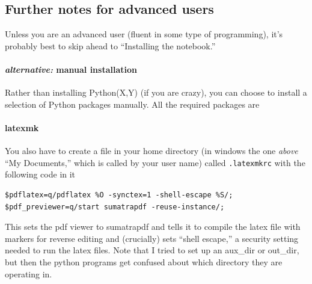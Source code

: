 \subsection{Further notes for advanced users}
Unless you are an advanced user (fluent in some type of programming),
    it's probably best to skip ahead
    to ``Installing the notebook.''
\paragraph{\textit{alternative:} manual installation}
Rather than installing Python(X,Y) (if you are crazy),
    you can choose to install a selection of Python packages manually.
All the required packages are
    \paragraph{latexmk}
You also have to create a file in your home directory (in windows the one \textit{above} ``My Documents,'' which is called by your user name) called \texttt{.latexmkrc} with the following code in it
\begin{verbatim}
$pdflatex=q/pdflatex %O -synctex=1 -shell-escape %S/;
$pdf_previewer=q/start sumatrapdf -reuse-instance/;
\end{verbatim}
This sets the pdf viewer to sumatrapdf and tells it to compile the latex file
    with markers for reverse editing and (crucially) sets ``shell escape,''
    a security setting needed to run the latex files.
Note that I tried to set up an aux\_dir or out\_dir,
    but then the python programs get confused about which directory
    they are operating in.

